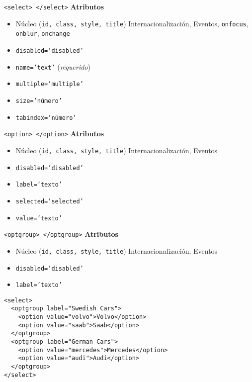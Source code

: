 \documentclass{beamer}
\begin{document}
\begin{frame}{\texttt{<select> </select>}} %
    \textbf{Atributos}
    \begin{itemize}
        \item Núcleo (\texttt{id, class, style, title}) Internacionalización,
        Eventos, \texttt{onfocus}, \texttt{onblur}, \texttt{onchange}
        \item \texttt{disabled='disabled'}
        \item \texttt{name='text'} (\textit{requerido})
        \item \texttt{multiple='multiple'} 
        \item \texttt{size='número'}
        \item \texttt{tabindex='número'}
    \end{itemize}
\end{frame}


\begin{frame}{\texttt{<option> </option>}} %
    \textbf{Atributos}
    \begin{itemize}
        \item Núcleo (\texttt{id, class, style, title}) Internacionalización,
        Eventos
        \item \texttt{disabled='disabled'}
        \item \texttt{label='texto'}
        \item \texttt{selected='selected'}
        \item \texttt{value='texto'}
    \end{itemize}
\end{frame}

\begin{frame}[fragile]{\texttt{<optgroup> </optgroup>}} %
    \textbf{Atributos}
    \begin{itemize}
        \item Núcleo (\texttt{id, class, style, title}) Internacionalización,
        Eventos
        \item \texttt{disabled='disabled'}
        \item \texttt{label='texto'}
    \end{itemize}

    \begin{lstlisting}
<select>
  <optgroup label="Swedish Cars">
    <option value="volvo">Volvo</option>
    <option value="saab">Saab</option>
  </optgroup>
  <optgroup label="German Cars">
    <option value="mercedes">Mercedes</option>
    <option value="audi">Audi</option>
  </optgroup>
</select>        
    \end{lstlisting}
    
\end{frame}
\end{document}

